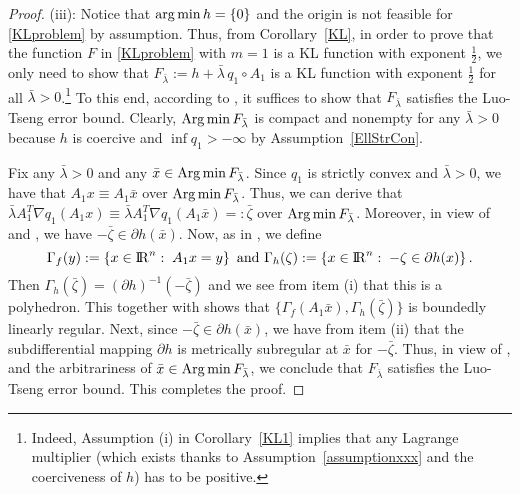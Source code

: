 \documentclass[10pt]{article}
\numberwithin{equation}{section}
\def\R{{\rm I\!R}}
\def\argmin{\mathop{\rm arg\,min}}
\def\Argmin{\mathop{\rm Arg\,min}}
\begin{document}
\begin{proof}
(iii): Notice that $\argmin h = \{0\}$ and the origin is not feasible for \eqref{KLproblem} by assumption. Thus, from Corollary~\ref{KL}, in order to prove that the function $F$ in \eqref{KLproblem} with $m = 1$ is a KL function with exponent $\frac{1}{2}$, we only need to show that $F_{\bar{\lambda}}:= h + \bar{\lambda}\, q_1\circ A_1$ is a KL function with exponent $\frac{1}{2}$ for all $\bar{\lambda} > 0$.\footnote{Indeed, Assumption (i) in Corollary~\ref{KL1} implies that any Lagrange multiplier (which exists thanks to Assumption~\ref{assumptionxxx} and the coerciveness of $h$) has to be positive.} To this end, according to \cite[Theorem~4.1]{LiPong18}, it suffices to show that $F_{\bar{\lambda}}$ satisfies the Luo-Tseng error bound.
Clearly, $\Argmin F_{\bar\lambda}$ is compact and nonempty for any $\bar \lambda > 0$ because $h$ is coercive and $\inf q_1 > -\infty$ by Assumption~\ref{EllStrCon}.

Fix any $\bar\lambda > 0$ and any $\bar{x} \in\Argmin F_{\bar{\lambda}}$. Since $q_1$ is strictly convex and $\bar \lambda > 0$, we have that $A_1x\equiv A_1\bar x$ over $\Argmin F_{\bar{\lambda}}$. Thus, we can derive that $\bar\lambda A_1^T\nabla q_1(A_1x)\equiv \bar\lambda A_1^T\nabla q_1(A_1\bar x)=: \bar{\zeta}$ over $\Argmin F_{\bar{\lambda}}$. Moreover, in view of \cite[Theorem~10.1]{RoWe98} and \cite[Exercise~8.8(c)]{RoWe98}, we have $-\bar{\zeta}\in\partial h(\bar{x})$. Now, as in \cite[Section~3.3]{ZhSo17}, we define
\[
\Gamma_f(y):= \left\{x\in\R^n:\; A_1x = y\right\} \text{  and  } \Gamma_{h}(\zeta):= \left\{x\in\R^n:\; -\zeta\in\partial h(x)\right\}.
\]
Then $ \Gamma_{h}(\bar{\zeta}) = (\partial h)^{-1}(-\bar{\zeta})$ and we see from item (i) that this is a polyhedron. This together with \cite[Corollary~3]{BaBL99} shows that $\{\Gamma_f(A_1\bar{x}), \Gamma_{h}(\bar{\zeta})\}$ is boundedly linearly regular. Next, since $-\bar{\zeta}\in\partial h(\bar{x})$, we have from item (ii) that the subdifferential mapping $\partial h$ is metrically subregular at $\bar{x}$ for $-\bar{\zeta}$. Thus, in view of \cite[Theorem~2]{ZhSo17}, \cite[Corollary~1]{ZhSo17} and the arbitrariness of $\bar{x}\in\Argmin F_{\bar{\lambda}}$, we conclude that $F_{\bar{\lambda}}$ satisfies the Luo-Tseng error bound. This completes the proof.
\end{proof}
\end{document}

